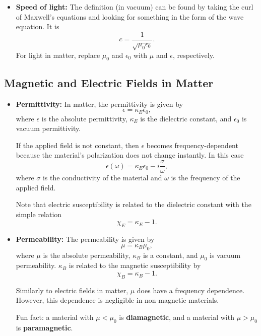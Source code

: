 \documentclass[%
 reprint,
superscriptaddress,
 amsmath,amssymb,
 aps,
prc,
]{revtex4-1}
\begin{document}
\begin{itemize}
	\item \textbf{Speed of light:} The definition (in vacuum) can be found by taking the curl of Maxwell's equations and looking for something in the form of the wave equation. It is
	\begin{equation}
	    c=\frac{1}{\sqrt{\mu_0\epsilon_0}}.
	\end{equation}
	For light in matter, replace $\mu_0$ and $\epsilon_0$ with $\mu$ and $\epsilon$, respectively.
\end{itemize}

\subsection{Magnetic and Electric Fields in Matter}

\begin{itemize}
	\item \textbf{Permittivity:} In matter, the permittivity is given by
	\begin{equation}
		\epsilon = \kappa_E \epsilon_0,
	\end{equation}
	where $\epsilon$ is the absolute permittivity, $\kappa_E$ is the dielectric constant, and $\epsilon_0$ is vacuum permittivity. 
	
	If the applied field is not constant, then $\epsilon$ becomes frequency-dependent because the material's polarization does not change instantly. In this case
	\begin{equation}
		\epsilon (\omega) = \kappa_E\epsilon_0 - i \frac{\sigma}{\omega},
	\end{equation}
	where $\sigma$ is the conductivity of the material and $\omega$ is the frequency of the applied field.
	
	Note that electric susceptibility is related to the dielectric constant with the simple relation
	\begin{equation}
		\chi_E = \kappa_E - 1.
	\end{equation} 
	
	\item \textbf{Permeability:} The permeability is given by
	\begin{equation}
		\mu = \kappa_B \mu_0,
	\end{equation}
	where $\mu$ is the absolute permeability, $\kappa_B$ is a constant, and $\mu_0$ is vacuum permeability. $\kappa_B$ is related to the magnetic susceptibility by
	\begin{equation}
		\chi_B = \kappa_B - 1.
	\end{equation}
	
	Similarly to electric fields in matter, $\mu$ does have a frequency dependence. However, this dependence is negligible in non-magnetic materials.
	
	Fun fact: a material with $\mu < \mu_0$ is \textbf{diamagnetic}, and a material with $\mu > \mu_0$ is \textbf{paramagnetic}.
\end{itemize}
\end{document}
